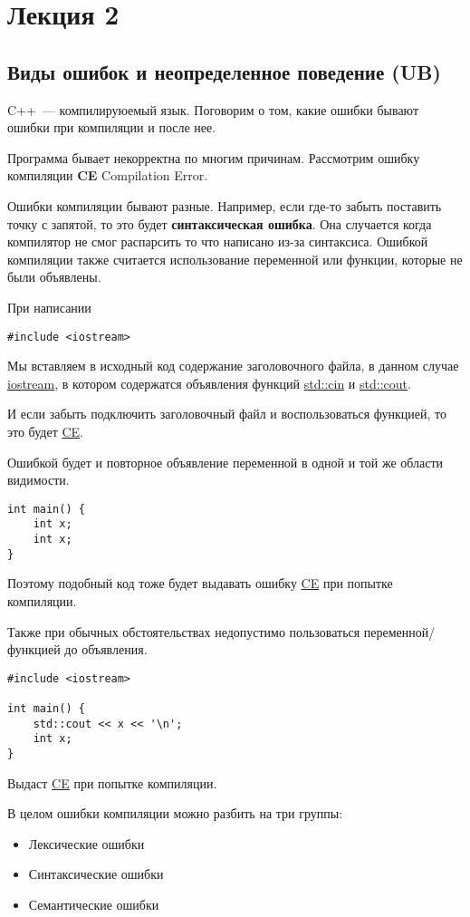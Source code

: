 \section*{Лекция 2}
\subsection{Виды ошибок и неопределенное поведение (UB)}

C++~--- компилируюемый язык. Поговорим о том, какие ошибки бывают ошибки при компиляции и после нее.


Программа бывает некорректна по многим причинам. 
Рассмотрим ошибку компиляции \textbf{CE} Compilation Error.

Ошибки компиляции бывают разные. Например, если где-то забыть поставить точку с запятой,
то это будет \textbf{синтаксическая ошибка}. Она случается когда компилятор не смог распарсить то что написано из-за синтаксиса.
Ошибкой компиляции также считается использование переменной или функции, которые не были объявлены. 

При написании
\begin{verbatim}
#include <iostream>    
\end{verbatim}

Мы вставляем в исходный код содержание заголовочного файла, в данном случае \underline{iostream}, 
в котором содержатся объявления функций \underline{std::cin} и \underline{std::cout}.

И если забыть подключить заголовочный файл и воспользоваться функцией, то это будет \underline{CE}.

Ошибкой будет и повторное объявление переменной в одной и той же области видимости.
\begin{verbatim}
int main() {
    int x;
    int x;
}
\end{verbatim}

Поэтому подобный код тоже будет выдавать ошибку \underline{CE} при попытке компиляции.

Также при обычных обстоятельствах недопустимо пользоваться переменной/функцией до объявления.

\begin{verbatim}
#include <iostream>

int main() {
    std::cout << x << '\n';
    int x;
}
\end{verbatim}
Выдаст \underline{CE} при попытке компиляции.


В целом ошибки компиляции можно разбить на три группы:
\begin{itemize}
    \item Лексические ошибки
    \item Синтаксические ошибки
    \item Семантические ошибки
\end{itemize}


